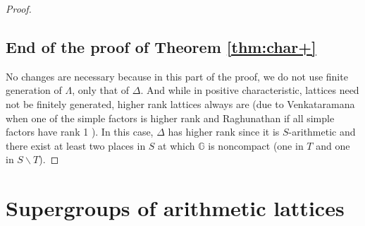 \documentclass[JEP,XML,SOM,Unicode,published]{cedram}
\let\bs\backslash
\newcommand{\bbG}{\ensuremath{\mathbb{G}}}
\theoremstyle{definition}
\begin{document}
\begin{proof}
\subsection{End of the proof of Theorem \ref{thm:char+}} No changes are necessary because in this part of the proof, we do not use finite generation of $\Lambda$, only that of $\Delta$. And while in positive characteristic, lattices need not be finitely generated, higher rank lattices always are (due to Venkataramana when one of the simple factors is higher rank \cite{venky-thesis} and Raghunathan if all simple factors have rank 1 \cite{raghunathan-fg}). In this case, $\Delta$ has higher rank since it is $S$-arithmetic and there exist at least two places in $S$ at which $\bbG$ is noncompact (one in $T$ and one in $S\bs T$). \end{proof}

\section{Supergroups of arithmetic lattices}
\label{sec:venky}
\end{document}
